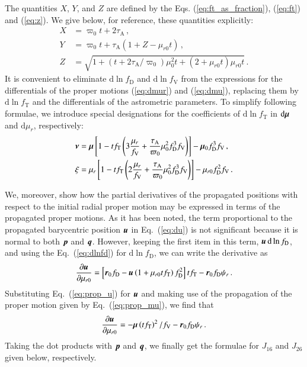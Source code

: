 \documentclass{aa}
\def\vec#1{\ensuremath{\mathchoice{\mbox{\boldmath$\displaystyle#1$}}
{\mbox{\boldmath$\textstyle#1$}}
{\mbox{\boldmath$\scriptstyle#1$}}
{\mbox{\boldmath$\scriptscriptstyle#1$}}}}
\begin{document}
 The quantities $X$, $Y$, and $Z$ are defined by the Eqs. (\ref{eq:ft_as_fraction}), (\ref{eq:ft}) and (\ref{eq:z}). We give below, for reference, these quantities explicitly:
\begin{equation*}
 \begin{aligned}
  X&=\varpi_0t+2\tau_\mathrm{A}\,,\\
  Y&=\varpi_0t+\tau_\mathrm{A}\left(1+Z-\mu_{r0}t\right)\,,\\
  Z&=\sqrt{
    1+\left(t+2\tau_\mathrm{A}/\varpi_0\right)\mu_0^2t+\left(2+\mu_{r0}t\right)\mu_{r0}t}\,.
 \end{aligned}
\end{equation*}
It is convenient to eliminate $\mathrm{d}\ln f_\mathrm{D}$ and $\mathrm{d}\ln f_\mathrm{V}$ from the expressions for the differentials of the proper motions (\ref{eq:dmur}) and (\ref{eq:dmu}), replacing them by $\mathrm{d}\ln f_\mathrm{T}$ and the differentials of the astrometric parameters. To simplify following formulae, we introduce special designations for the coefficients of $\mathrm{d}\ln f_\mathrm{T}$ in $\mathrm{d}\vec{\mu}$ and $\mathrm{d}\mu_r$, respectively:
\begin{equation*}
 \begin{aligned}
  \vec{\nu}&=\vec{\mu}\left[
    1-tf_\mathrm{T}
    \left(3\frac{\mu_r}{f_\mathrm{V}}
    +\frac{\tau_\mathrm{A}}{\varpi_0}\mu_0^2f_\mathrm{D}^3f_\mathrm{V}
    \right)
    \right]
    -\vec{\mu}_0f_\mathrm{D}^3f_\mathrm{V}\,,\\
  \xi&=\mu_r\left[
    1-tf_\mathrm{T}
    \left(2\frac{\mu_r}{f_\mathrm{V}}
    +\frac{\tau_\mathrm{A}}{\varpi_0}\mu_0^2f_\mathrm{D}^3f_\mathrm{V}
    \right)
    \right]
    -\mu_{r0}f_\mathrm{D}^2f_\mathrm{V}\,.\\
 \end{aligned}
\end{equation*}

We, moreover, show how the partial derivatives of the propagated positions with respect to the initial radial proper motion may be expressed in terms of the propagated proper motions. As it has been noted, the term proportional to the propagated barycentric position $\vec{u}$ in Eq.~(\ref{eq:du}) is not significant because it is normal to both $\vec{p}$ and $\vec{q}$. However, keeping the first item in this term, $\vec{u}\,\mathrm{d}\ln f_\mathrm{D}$, and using the Eq.~(\ref{eq:dlnfd}) for $\mathrm{d}\ln f_\mathrm{D}$, we can write the derivative as
\begin{equation*}
 \frac{\partial\vec{u}}{\partial\mu_{r0}}=\left[\vec{r}_0f_\mathrm D-\vec{u}\left(1+\mu_{r0}tf_\mathrm T\right)f_\mathrm D^2\right]tf_\mathrm T-\vec{r}_0f_\mathrm D\psi_r\,.
\end{equation*}
Substituting Eq.~(\ref{eq:prop_u}) for $\vec{u}$ and making use of the propagation of the proper motion given by Eq.~(\ref{eq:prop_mu}), we find that
\begin{equation*}
 \frac{\partial\vec{u}}{\partial\mu_{r0}}=-\vec{\mu}\left(tf_\mathrm T\right)^2/f_\mathrm V-\vec{r}_0f_\mathrm D\psi_r\,.
\end{equation*}
Taking the dot products with $\vec{p}$ and $\vec{q}$, we finally get the formulae for $J_{16}$ and $J_{26}$ given below, respectively.
\end{document}
